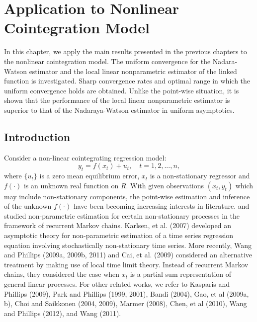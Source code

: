\chapter{Application to Nonlinear Cointegration Model}
\ifpdf
    \graphicspath{{Chapter3/Chapter3Figs/PNG/}{Chapter3/Chapter3Figs/PDF/}{Chapter3/Chapter3Figs/}}
\else
    \graphicspath{{Chapter3/Chapter3Figs/EPS/}{Chapter3/Chapter3Figs/}}
\fi

In this chapter, we apply the main results presented in the previous chapters to the nonlinear cointegration model. The uniform convergence for the Nadara-Watson estimator and the local linear nonparametric  estimator of the linked function is investigated. Sharp convergence rates and optimal range in which the uniform convergence holds are obtained. Unlike the point-wise situation, it is shown that the performance of the local linear nonparametric  estimator is superior to that of the Nadaraya-Watson estimator in uniform asymptotics.


\section{Introduction}

Consider a non-linear cointegrating regression model:
\begin{equation}
y_{t}=f(x_{t})+u_{t},\quad t=1,2,...,n,  \label{eqn:4:mo1}
\end{equation}%
where $\{u_{t}\}$ is a  zero mean  equilibrium error, $x_{t}$ is a
non-stationary  regressor and  $f(\cdot)$ is an unknown  real function on $R$. With given observations $(x_t, y_t)$ which may include
non-stationary components, the point-wise estimation  and
inference of the unknown $f(\cdot)$ have been becoming increasing
interests in literature. \cite{karlsentjostheim2001} and \cite{guerre2004} studied
non-parametric estimation for certain non-stationary processes in the
framework of recurrent Markov chains. Karlsen, et al. (2007)
developed an asymptotic theory for non-parametric estimation of a
time series regression equation involving stochastically
non-stationary time series. More recently,  Wang and Phillips (2009a, 2009b, 2011) and Cai, et al. (2009) considered an alternative treatment by making use of local
time limit theory. Instead of recurrent Markov chains, they considered the case when
$x_t$ is a partial sum representation of general linear processes.
 For other related works, we refer to Kasparis and Phillips (2009),
 Park and  Phillips (1999, 2001), Bandi (2004), Gao, et al (2009a, b),
  Choi and Saikkonen (2004, 2009),  Marmer (2008), Chen, et al (2010),  Wang and Phillips (2012), and  Wang (2011).

